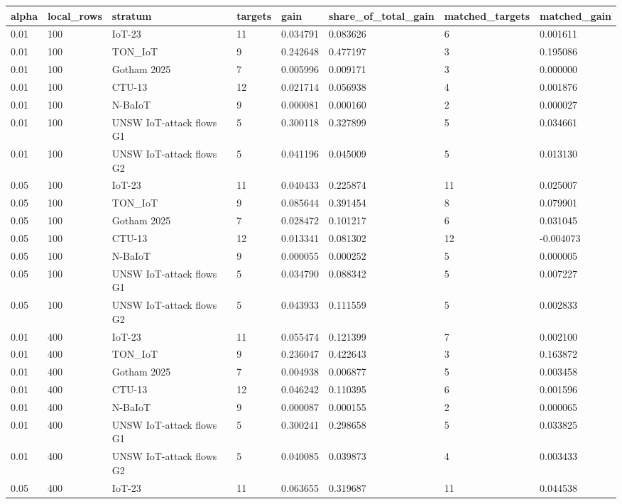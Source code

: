 \begin{tabular}{llllllll}
\toprule
alpha & local\_rows & stratum & targets & gain & share\_of\_total\_gain & matched\_targets & matched\_gain \\
\midrule
0.01 & 100 & IoT-23 & 11 & 0.034791 & 0.083626 & 6 & 0.001611 \\
0.01 & 100 & TON\_IoT & 9 & 0.242648 & 0.477197 & 3 & 0.195086 \\
0.01 & 100 & Gotham 2025 & 7 & 0.005996 & 0.009171 & 3 & 0.000000 \\
0.01 & 100 & CTU-13 & 12 & 0.021714 & 0.056938 & 4 & 0.001876 \\
0.01 & 100 & N-BaIoT & 9 & 0.000081 & 0.000160 & 2 & 0.000027 \\
0.01 & 100 & UNSW IoT-attack flows G1 & 5 & 0.300118 & 0.327899 & 5 & 0.034661 \\
0.01 & 100 & UNSW IoT-attack flows G2 & 5 & 0.041196 & 0.045009 & 5 & 0.013130 \\
0.05 & 100 & IoT-23 & 11 & 0.040433 & 0.225874 & 11 & 0.025007 \\
0.05 & 100 & TON\_IoT & 9 & 0.085644 & 0.391454 & 8 & 0.079901 \\
0.05 & 100 & Gotham 2025 & 7 & 0.028472 & 0.101217 & 6 & 0.031045 \\
0.05 & 100 & CTU-13 & 12 & 0.013341 & 0.081302 & 12 & -0.004073 \\
0.05 & 100 & N-BaIoT & 9 & 0.000055 & 0.000252 & 5 & 0.000005 \\
0.05 & 100 & UNSW IoT-attack flows G1 & 5 & 0.034790 & 0.088342 & 5 & 0.007227 \\
0.05 & 100 & UNSW IoT-attack flows G2 & 5 & 0.043933 & 0.111559 & 5 & 0.002833 \\
0.01 & 400 & IoT-23 & 11 & 0.055474 & 0.121399 & 7 & 0.002100 \\
0.01 & 400 & TON\_IoT & 9 & 0.236047 & 0.422643 & 3 & 0.163872 \\
0.01 & 400 & Gotham 2025 & 7 & 0.004938 & 0.006877 & 5 & 0.003458 \\
0.01 & 400 & CTU-13 & 12 & 0.046242 & 0.110395 & 6 & 0.001596 \\
0.01 & 400 & N-BaIoT & 9 & 0.000087 & 0.000155 & 2 & 0.000065 \\
0.01 & 400 & UNSW IoT-attack flows G1 & 5 & 0.300241 & 0.298658 & 5 & 0.033825 \\
0.01 & 400 & UNSW IoT-attack flows G2 & 5 & 0.040085 & 0.039873 & 4 & 0.003433 \\
0.05 & 400 & IoT-23 & 11 & 0.063655 & 0.319687 & 11 & 0.044538 \\

\end{tabular}
